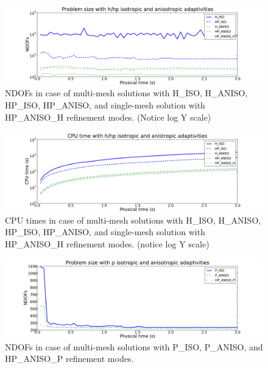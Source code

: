 \begin{figure}
  \begin{centering}
  \includegraphics[width=\columnwidth]{isoaniso_dof}
  \caption{\label{fig:isoanisodof} NDOFs in case 
  of multi-mesh solutions with H\_ISO, H\_ANISO,
  HP\_ISO, HP\_ANISO, and single-mesh solution with HP\_ANISO\_H
  refinement modes. (Notice log Y scale)}
  \end{centering}
\end{figure}
\begin{figure}
  \begin{centering}
  \includegraphics[width=\columnwidth]{isoaniso_cpu}
  \caption{\label{fig:isoanisocpu} CPU times in case 
  of multi-mesh solutions with H\_ISO, H\_ANISO,
  HP\_ISO, HP\_ANISO, and single-mesh solution with HP\_ANISO\_H
  refinement modes. (notice log Y scale)}
  \end{centering}
\end{figure}
\begin{figure}
  \begin{centering}
  \includegraphics[width=\columnwidth]{isoanisop_dof}
  \caption{\label{fig:isoanisopdof} NDOFs in case 
  of multi-mesh solutions with P\_ISO, P\_ANISO, and
  HP\_ANISO\_P refinement modes.}
  \end{centering}
\end{figure}
